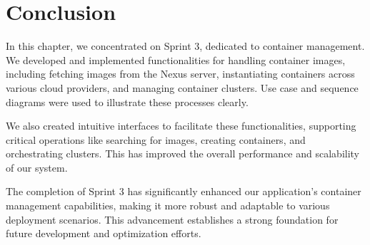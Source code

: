 \vspace*{7cm}

\section*{Conclusion}
In this chapter, we concentrated on Sprint 3, dedicated to container management. We developed and implemented functionalities for handling container images, including fetching images from the Nexus server, instantiating containers across various cloud providers, and managing container clusters. Use case and sequence diagrams were used to illustrate these processes clearly.


We also created intuitive interfaces to facilitate these functionalities, supporting critical operations like searching for images, creating containers, and orchestrating clusters. This has improved the overall performance and scalability of our system.


The completion of Sprint 3 has significantly enhanced our application's container management capabilities, making it more robust and adaptable to various deployment scenarios. This advancement establishes a strong foundation for future development and optimization efforts.